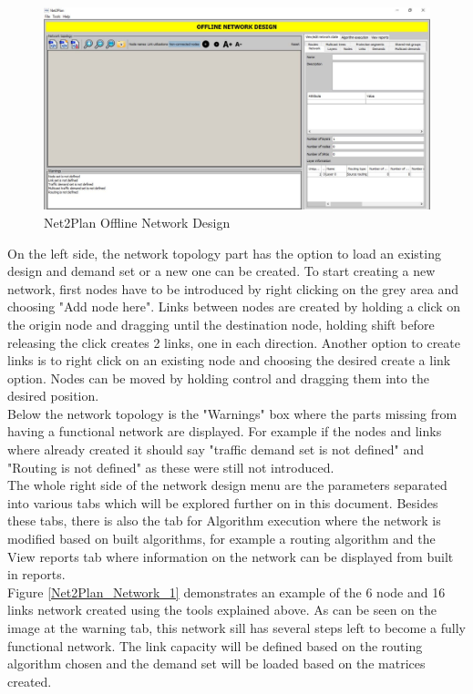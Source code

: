 	\begin{figure}[h!]
		\centering
		\includegraphics[width = 17cm]{Net2Plan_Network.pdf}
		\caption{Net2Plan Offline Network Design}
		\label{Net2Plan_Network}
	\end{figure}
	
	On the left side, the network topology part has the option to load an existing design and demand set or a new one can be created. To start creating a new network, first nodes have to be introduced by right clicking on the grey area and choosing "Add node here". Links between nodes are created by holding a click on the origin node and dragging until the destination node, holding shift before releasing the click creates 2 links, one in each direction. Another option to create links is to right click on an existing node and choosing the desired create a link option. Nodes can be moved by holding control and dragging them into the desired position.\\
	
	Below the network topology is the "Warnings" box where the parts missing from having a functional network are displayed. For example if the nodes and links where already created it should say "traffic demand set is not defined" and "Routing is not defined" as these were still not introduced.\\
	
	The whole right side of the network design menu are the parameters separated into various tabs which will be explored further on in this document. Besides these tabs, there is also the tab for Algorithm execution where the network is modified based on built algorithms, for example a routing algorithm and the View reports tab where information on the network can be displayed from built in reports. \\

	Figure \ref{Net2Plan_Network_1} demonstrates an example of the 6 node and 16 links network created using the tools explained above. As can be seen on the image at the warning tab, this network sill has several steps left to become a fully functional network. The link capacity will be defined based on the routing algorithm chosen and the demand set will be loaded based on the matrices created. \\
		
